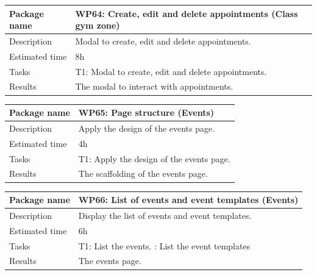 \documentclass[a4paper, 12pt, oneside]{book}
\begin{document}
\vspace*{16pt}
\begin{tabularx}{\textwidth}{| l | X |}
	\hline
	\rowcolor{rowColor}
	{\semibf Package name}   & {\semibf WP64}: Create, edit and delete appointments (Class gym zone) \\
	\hline
	{\semibf Description}    & Modal to create, edit and delete appointments.                        \\
	\hline
	\rowcolor{rowColor}
	{\semibf Estimated time} & 8h                                                                    \\
	\hline
	{\semibf Tasks}          & {\semibf T1}: Modal to create, edit and delete appointments.          \\
	\hline
	\rowcolor{rowColor}
	{\semibf Results}        & The modal to interact with appointments.                              \\
	\hline
\end{tabularx}
\vspace*{16pt}
\begin{tabularx}{\textwidth}{| l | X |}
	\hline
	\rowcolor{rowColor}
	{\semibf Package name}   & {\semibf WP65}: Page structure (Events)            \\
	\hline
	{\semibf Description}    & Apply the design of the events page.               \\
	\hline
	\rowcolor{rowColor}
	{\semibf Estimated time} & 4h                                                 \\
	\hline
	{\semibf Tasks}          & {\semibf T1}: Apply the design of the events page. \\
	\hline
	\rowcolor{rowColor}
	{\semibf Results}        & The scaffolding of the events page.                \\
	\hline
\end{tabularx}
\vspace*{16pt}
\begin{tabularx}{\textwidth}{| l | X |}
	\hline
	\rowcolor{rowColor}
	{\semibf Package name}   & {\semibf WP66}: List of events and event templates (Events) \\
	\hline
	{\semibf Description}    & Display the list of events and event templates.             \\
	\hline
	\rowcolor{rowColor}
	{\semibf Estimated time} & 6h                                                          \\
	\hline
	{\semibf Tasks}          & {\semibf T1}: List the events.
	\newline {\semibf T2}: List the event templates                                        \\
	\hline
	\rowcolor{rowColor}
	{\semibf Results}        & The events page.                                            \\
	\hline
\end{tabularx}
\end{document}
